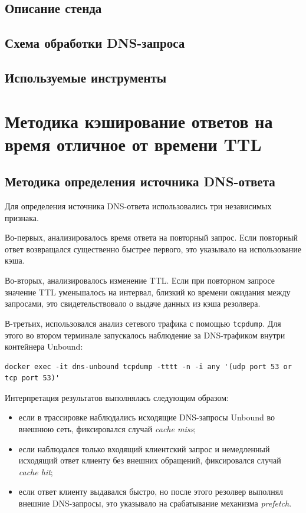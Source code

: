 \documentclass[a4paper,14pt]{extarticle}
\begin{document}
\subsection{Описание стенда}
\subsection{Схема обработки DNS-запроса}
\subsection{Используемые инструменты}

\section{Методика кэширование ответов на время отличное от времени TTL}

\subsection{Методика определения источника DNS-ответа}
Для определения источника DNS-ответа использовались три независимых признака.

Во-первых, анализировалось время ответа на повторный запрос. Если повторный ответ возвращался существенно быстрее первого, это указывало на использование кэша.

Во-вторых, анализировалось изменение TTL. Если при повторном запросе значение TTL уменьшалось на интервал, близкий ко времени ожидания между запросами, это свидетельствовало о выдаче данных из кэша резолвера.

В-третьих, использовался анализ сетевого трафика с помощью \texttt{tcpdump}. Для этого во втором терминале запускалось наблюдение за DNS-трафиком внутри контейнера Unbound:

\begin{lstlisting}
docker exec -it dns-unbound tcpdump -tttt -n -i any '(udp port 53 or tcp port 53)'
\end{lstlisting}

Интерпретация результатов выполнялась следующим образом:
\begin{itemize}
    \item если в трассировке наблюдались исходящие DNS-запросы Unbound во внешнюю сеть, фиксировался случай \textit{cache miss};
    \item если наблюдался только входящий клиентский запрос и немедленный исходящий ответ клиенту без внешних обращений, фиксировался случай \textit{cache hit};
    \item если ответ клиенту выдавался быстро, но после этого резолвер выполнял внешние DNS-запросы, это указывало на срабатывание механизма \textit{prefetch}.
\end{itemize}
\end{document}
